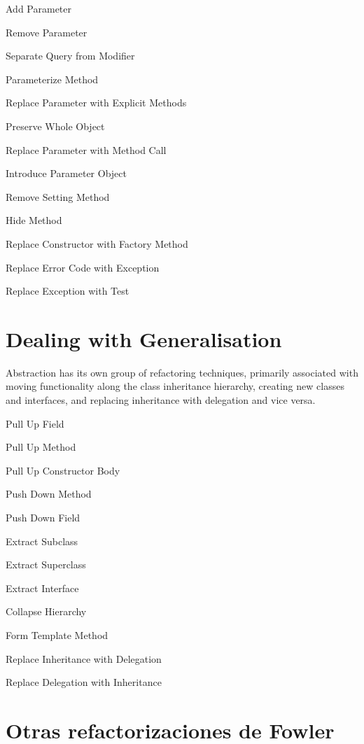 \documentclass[11pt,a4paper,oneside]{book}
\begin{document}
%


     
    
    Add Parameter
    
    Remove Parameter
    
    Separate Query from Modifier
    
    Parameterize Method
    
    Replace Parameter with Explicit Methods
    
    Preserve Whole Object
    
    Replace Parameter with Method Call
    
    Introduce Parameter Object
    
    Remove Setting Method
    
    Hide Method
    
    Replace Constructor with Factory Method
    
    Replace Error Code with Exception
    
    Replace Exception with Test




\section{Dealing with Generalisation}

Abstraction has its own group of refactoring techniques, primarily associated with moving functionality along the class inheritance hierarchy, creating new classes and interfaces, and replacing inheritance with delegation and vice versa.

    Pull Up Field
    
    Pull Up Method
    
    Pull Up Constructor Body
    
    Push Down Method
    
    Push Down Field
    
    Extract Subclass
    
    Extract Superclass
    
    Extract Interface
    
    Collapse Hierarchy
    
    Form Template Method
    
    Replace Inheritance with Delegation
    
    Replace Delegation with Inheritance


\section{Otras refactorizaciones de Fowler}
\end{document}

